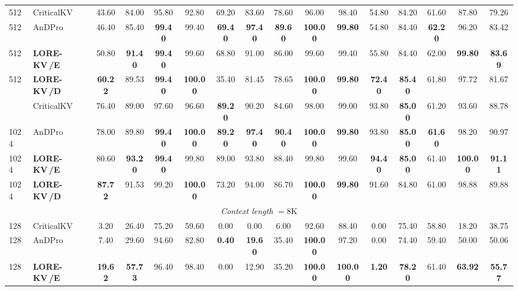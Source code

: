 \documentclass{article} %
\newcommand{\best}[1]{\textcolor{bestblue}{\textbf{#1}}}
\newcommand{\second}[1]{\textcolor{secondorange}{#1}}
\newcommand{\lorekvE}{LORE-KV\,/E}
\newcommand{\lorekvD}{LORE-KV\,/D}
\begin{document}
\begin{table}[p]
{\begin{tabular}{llcccccccccccccc}
512 & CriticalKV & 43.60 & 84.00 & \second{95.80} & 92.80 & \second{69.20} & 83.60 & 78.60 & 96.00 & 98.40 & 54.80 & 84.20 & 61.60 & 87.80 & 79.26 \\
512 & AnDPro & 46.40 & 85.40 & \best{99.40} & 99.40 & \best{69.40} & \best{97.40} & \best{89.60} & \best{100.00} & \best{99.80} & 54.80 & \second{84.40} & \best{62.20} & 96.20 & \second{83.42} \\
512 & \textbf{\lorekvE} & \second{50.80} & \best{91.40} & \best{99.40} & \second{99.60} & 68.80 & \second{91.00} & \second{86.00} & \second{99.60} & \second{99.40} & \second{55.80} & \second{84.40} & \second{62.00} & \best{99.80} & \best{83.69} \\
512 & \textbf{\lorekvD} & \best{60.22} & \second{89.53} & \best{99.40} & \best{100.00} & 35.40 & 81.45 & 78.65 & \best{100.00} & \best{99.80} & \best{72.40} & \best{85.40} & 61.80 & \second{97.72} & 81.67 \\
\addlinespace[2pt]
1024 & CriticalKV & 76.40 & 89.00 & 97.60 & 96.60 & \best{89.20} & 90.20 & 84.60 & 98.00 & 99.00 & \second{93.80} & \best{85.00} & 61.20 & 93.60 & 88.78 \\
1024 & AnDPro & 78.00 & 89.80 & \best{99.40} & \best{100.00} & \best{89.20} & \best{97.40} & \best{90.40} & \best{100.00} & \best{99.80} & \second{93.80} & \best{85.00} & \best{61.60} & 98.20 & \second{90.97} \\
1024 & \textbf{\lorekvE} & \second{80.60} & \best{93.20} & \best{99.40} & \second{99.80} & \second{89.00} & 93.80 & \second{88.40} & \second{99.80} & \second{99.60} & \best{94.40} & \best{85.00} & \second{61.40} & \best{100.00} & \best{91.11} \\
1024 & \textbf{\lorekvD} & \best{87.72} & \second{91.53} & \second{99.20} & \best{100.00} & 73.20 & \second{94.00} & 86.70 & \best{100.00} & \best{99.80} & 91.60 & \second{84.80} & 61.00 & \second{98.88} & 89.88 \\
\midrule
\multicolumn{16}{c}{\textit{Context length} $=8$K} \\
\midrule
128 & CriticalKV & 3.20 & 26.40 & 75.20 & 59.60 & \second{0.00} & 0.00 & 6.00 & \second{92.60} & 88.40 & 0.00 & 75.40 & 58.80 & 18.20 & 38.75 \\
128 & AnDPro & 7.40 & 29.60 & 94.60 & 82.80 & \best{0.40} & \best{19.60} & \second{35.40} & \best{100.00} & \second{97.20} & 0.00 & 74.40 & 59.40 & \second{50.00} & 50.06 \\
128 & \textbf{\lorekvE} & \best{19.62} & \best{57.73} & \second{96.40} & \second{98.40} & \second{0.00} & 12.90 & 35.20 & \best{100.00} & \best{100.00} & \best{1.20} & \best{78.20} & \second{61.40} & \best{63.92} & \best{55.77} \\

\end{tabular}}
\end{table}
\end{document}
